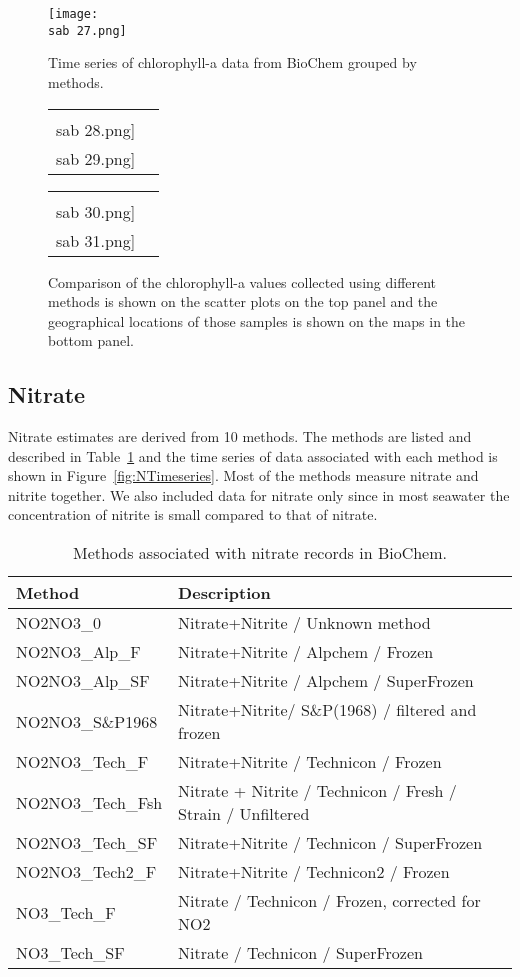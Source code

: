 \documentclass[letterpaper,portrait,11pt]{scrartcl}
\numberwithin{equation}{section}		%
\numberwithin{figure}{section}		%
\numberwithin{table}{section}				%
\newcommand{\ecomod}{\string~/ecomod_data/}   %
\newcommand{\sab}{\ecomod/mpa/sab/}   %
\begin{document}
\begin{appendices}
\begin{figure}[h]
  \label{fig:ChlaTimeseries}
  \centering
  \texttt{[image: \\sab 27.png]}
  \caption{Time series of chlorophyll-a data from BioChem grouped by methods.}
\end{figure}


\begin{figure}[h]
  \label{fig:ChlaComparison}
  \centering
  \begin{tabular}{cc}
    \texttt{[image: \\sab 28.png]}
    \texttt{[image: \\sab 29.png]} 
  \end{tabular}
  \begin{tabular}{cc}
    \texttt{[image: \\sab 30.png]}
    \texttt{[image: \\sab 31.png]}
  \end{tabular}
  \caption{Comparison of the chlorophyll-a values collected using different methods is shown on the scatter plots on the top panel and the geographical locations of those samples is shown on the maps in the bottom panel.}
\end{figure}


\subsection{Nitrate}

Nitrate estimates are derived from 10 methods. The methods are listed and described in Table~\ref{table:Nmethods} and the time series of data associated with each method is shown in Figure~\ref{fig:NTimeseries}. Most of the methods measure nitrate and nitrite together. We also included data for nitrate only since  in most seawater the concentration of nitrite is small compared to that of nitrate.

\begin{table}[h]
  \label{table:Nmethods}
  \caption{Methods associated with nitrate records in BioChem.}
  \begin{tabular}{ll}
    Method & Description\\
    \hline
    NO2NO3\_0 & Nitrate+Nitrite / Unknown method \\
    NO2NO3\_Alp\_F & Nitrate+Nitrite / Alpchem / Frozen \\
    NO2NO3\_Alp\_SF & Nitrate+Nitrite / Alpchem / SuperFrozen \\
    NO2NO3\_S\&P1968 & Nitrate+Nitrite/ S\&P(1968) / filtered and frozen \\
    NO2NO3\_Tech\_F & Nitrate+Nitrite / Technicon / Frozen \\
    NO2NO3\_Tech\_Fsh & Nitrate + Nitrite / Technicon / Fresh / Strain / Unfiltered \\
    NO2NO3\_Tech\_SF & Nitrate+Nitrite / Technicon / SuperFrozen \\
    NO2NO3\_Tech2\_F & Nitrate+Nitrite / Technicon2 / Frozen \\
    NO3\_Tech\_F & Nitrate / Technicon / Frozen, corrected for NO2 \\
    NO3\_Tech\_SF & Nitrate / Technicon / SuperFrozen\\
  \end{tabular}
\end{table}


\end{appendices}
\end{document}
